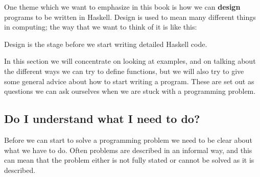 One theme which we want to emphasize in this book is how we can
\textbf{design} programs to be written in Haskell. 
Design is used to mean many different
things in computing; the way that we want to think of it is like this:
\begin{definition}
{Design is the
stage before we start writing detailed Haskell code.}
\end{definition} 
In this section we will concentrate on looking at examples, and on talking
about the different ways we can try to define functions, but we will
also try to give some general advice about how to start
writing a program. These are set out as questions we can ask ourselves when we are stuck
with a programming problem.

\subsection*{Do I understand what I need to do?}

Before we can start to solve a programming problem we need to be clear
about what we have to do. Often problems are described in an informal way, and
this can mean that the problem either is not fully stated or cannot be
solved as it is described.

